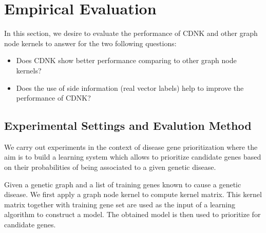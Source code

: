 \documentclass[review]{elsarticle}
\begin{document}
\section{Empirical Evaluation}
\label{empirical-evaluation-cdnk}
In this section, we desire to evaluate the performance of CDNK and other graph node kernels to answer for the two following questions:
\begin{itemize}
\item Does CDNK show better performance comparing to other graph node kernels?
\item Does the use of side information (real vector labels) help to improve the performance of CDNK?
\end{itemize}

\subsection{Experimental Settings and Evalution Method}
We carry out experiments in the context of disease gene prioritization where the aim is to build a learning system which allows to prioritize candidate genes based on their probabilities of being associated to a given genetic disease.

 Given a genetic graph and a list of training genes known to cause a genetic disease. We first apply  a graph node kernel to compute kernel matrix. This kernel matrix together with training gene set are used as the input of a learning algorithm to construct a model. The obtained model is then used to prioritize for candidate genes.
\end{document}
